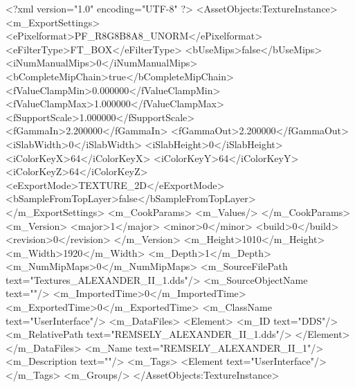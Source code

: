 <?xml version="1.0" encoding="UTF-8" ?>
<AssetObjects:TextureInstance>
	<m_ExportSettings>
		<ePixelformat>PF_R8G8B8A8_UNORM</ePixelformat>
		<eFilterType>FT_BOX</eFilterType>
		<bUseMips>false</bUseMips>
		<iNumManualMips>0</iNumManualMips>
		<bCompleteMipChain>true</bCompleteMipChain>
		<fValueClampMin>0.000000</fValueClampMin>
		<fValueClampMax>1.000000</fValueClampMax>
		<fSupportScale>1.000000</fSupportScale>
		<fGammaIn>2.200000</fGammaIn>
		<fGammaOut>2.200000</fGammaOut>
		<iSlabWidth>0</iSlabWidth>
		<iSlabHeight>0</iSlabHeight>
		<iColorKeyX>64</iColorKeyX>
		<iColorKeyY>64</iColorKeyY>
		<iColorKeyZ>64</iColorKeyZ>
		<eExportMode>TEXTURE_2D</eExportMode>
		<bSampleFromTopLayer>false</bSampleFromTopLayer>
	</m_ExportSettings>
	<m_CookParams>
		<m_Values/>
	</m_CookParams>
	<m_Version>
		<major>1</major>
		<minor>0</minor>
		<build>0</build>
		<revision>0</revision>
	</m_Version>
	<m_Height>1010</m_Height>
	<m_Width>1920</m_Width>
	<m_Depth>1</m_Depth>
	<m_NumMipMaps>0</m_NumMipMaps>
	<m_SourceFilePath text="Textures\REMSELY_ALEXANDER_II_1.dds"/>
	<m_SourceObjectName text=""/>
	<m_ImportedTime>0</m_ImportedTime>
	<m_ExportedTime>0</m_ExportedTime>
	<m_ClassName text="UserInterface"/>
	<m_DataFiles>
		<Element>
			<m_ID text="DDS"/>
			<m_RelativePath text="REMSELY_ALEXANDER_II_1.dds"/>
		</Element>
	</m_DataFiles>
	<m_Name text="REMSELY_ALEXANDER_II_1"/>
	<m_Description text=""/>
	<m_Tags>
		<Element text="UserInterface"/>
	</m_Tags>
	<m_Groups/>
</AssetObjects:TextureInstance>
